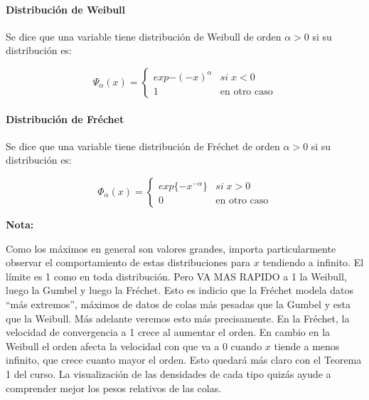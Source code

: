 \documentclass[
  oneside]{article}
\begin{document}
\hypertarget{distribuciuxf3n-de-weibull}{%
\paragraph{Distribución de Weibull}\label{distribuciuxf3n-de-weibull}}

Se dice que una variable tiene distribución de Weibull de orden
\(\alpha>0\) si su distribución es:

\begin{equation}
\Psi_{\alpha}(x)=\begin{cases}
exp{-(-x)^{\alpha}} & si\;x<0\\
1 & \text{en otro caso}
\end{cases}
\end{equation}

\hypertarget{distribuciuxf3n-de-fruxe9chet}{%
\paragraph{Distribución de
Fréchet}\label{distribuciuxf3n-de-fruxe9chet}}

Se dice que una variable tiene distribución de Fréchet de orden
\(\alpha>0\) si su distribución es:

\begin{equation}
\Phi_{\alpha}(x)=\begin{cases}
exp\{-x^{-\alpha}\} & si\;x>0\\
0 & \text{en otro caso}
\end{cases}
\end{equation}

\textbf{Nota:}

Como los máximos en general son valores grandes, importa particularmente
observar el comportamiento de estas distribuciones para \(x\) tendiendo
a infinito. El límite es 1 como en toda distribución. Pero VA MAS RAPIDO
a 1 la Weibull, luego la Gumbel y luego la Fréchet. Esto es indicio que
la Fréchet modela datos ``más extremos'', máximos de datos de colas más
pesadas que la Gumbel y esta que la Weibull. Más adelante veremos esto
más precisamente. En la Fréchet, la velocidad de convergencia a 1 crece
al aumentar el orden. En cambio en la Weibull el orden afecta la
velocidad con que va a 0 cuando \(x\) tiende a menos infinito, que crece
cuanto mayor el orden. Esto quedará más claro con el Teorema 1 del
curso. La visualización de las densidades de cada tipo quizás ayude a
comprender mejor los pesos relativos de las colas.

\newpage
\end{document}
